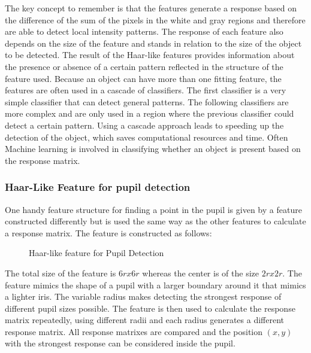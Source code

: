 The key concept to remember is that the features generate a response based on the difference of the sum of the pixels in the white and gray regions and therefore are able to detect local intensity patterns. The response of each feature also depends on the size of the feature and stands in relation to the size of the object to be detected. The result of the Haar-like features provides information about the presence or absence of a certain pattern reflected in the structure of the feature used. Because an object can have more than one fitting feature, the features are often used in a cascade of classifiers. The first classifier is a very simple classifier that can detect general patterns. The following classifiers are more complex and are only used in a region where the previous classifier could detect a certain pattern. Using a cascade approach leads to speeding up the detection of the object, which saves computational resources and time. Often Machine learning is involved in classifying whether an object is present based on the response matrix. 

\subsubsection{Haar-Like Feature for pupil detection }
One handy feature structure \cite{swirski_robust_2012} for finding a point in the pupil is given by a feature constructed differently but is used the same way as the other features to calculate a response matrix. The feature is constructed as follows: 
\begin{figure}
    \centering
\label{haar_pupil}
\caption{Haar-like feature for Pupil Detection}
\end{figure}
The total size of the feature is $6rx6r$ whereas the center is of the size $2rx2r$. The feature mimics the shape of a pupil with a larger boundary around it that mimics a lighter iris. The variable radius makes detecting the strongest response of different pupil sizes possible. The feature is then used to calculate the response matrix repeatedly, using different radii and each radius generates a different response matrix. All response matrixes are compared and the position $(x,y)$ with the strongest response can be considered inside the pupil.

